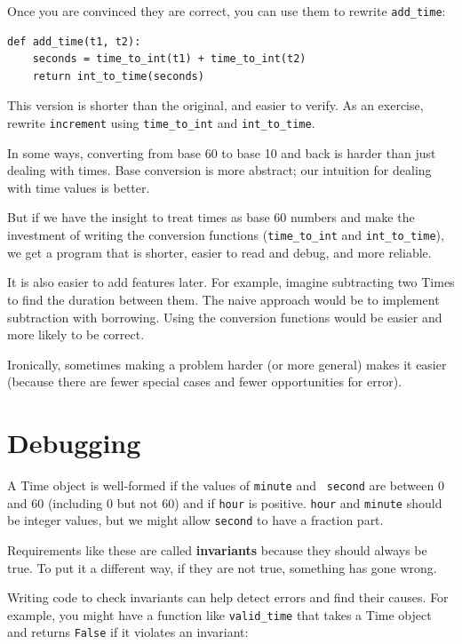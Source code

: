 \documentclass[10pt]{book}
\begin{document}
Once you are convinced they are correct, you can use them to
rewrite \verb"add_time":

\begin{verbatim}
def add_time(t1, t2):
    seconds = time_to_int(t1) + time_to_int(t2)
    return int_to_time(seconds)
\end{verbatim}
%
This version is shorter than the original, and easier to verify.  As
an exercise, rewrite {\tt increment} using \verb"time_to_int" and
\verb"int_to_time".

In some ways, converting from base 60 to base 10 and back is harder
than just dealing with times.  Base conversion is more abstract; our
intuition for dealing with time values is better.

But if we have the insight to treat times as base 60 numbers and make
the investment of writing the conversion functions (\verb"time_to_int"
and \verb"int_to_time"), we get a program that is shorter, easier to
read and debug, and more reliable.

It is also easier to add features later.  For example, imagine
subtracting two Times to find the duration between them.  The
naive approach would be to implement subtraction with borrowing.
Using the conversion functions would be easier and more likely to be
correct.

Ironically, sometimes making a problem harder (or more general) makes it
easier (because there are fewer special cases and fewer opportunities
for error).


\section{Debugging}

A Time object is well-formed if the values of {\tt minute} and {\tt
second} are between 0 and 60 (including 0 but not 60) and if
{\tt hour} is positive.  {\tt hour} and {\tt minute} should be
integer values, but we might allow {\tt second} to have a
fraction part.

Requirements like these are called {\bf invariants} because
they should always be true.  To put it a different way, if they
are not true, something has gone wrong.

Writing code to check invariants can help detect errors
and find their causes.  For example, you might have a function
like \verb"valid_time" that takes a Time object and returns
{\tt False} if it violates an invariant:
\end{document}
